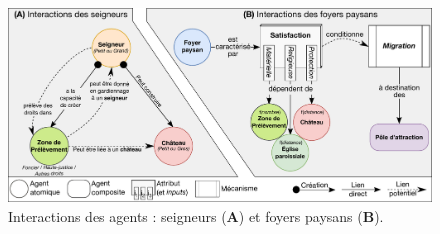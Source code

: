 \begin{figure}[H]
	\centering
	\includegraphics[width=\linewidth]{img/agents_interactions.pdf}
	\caption[Interactions des agents : seigneurs et foyers paysans.]{Interactions des agents : seigneurs (\textbf{A}) et foyers paysans (\textbf{B}).}
	\label{fig:interactions-agents}
\end{figure}

\medskip

